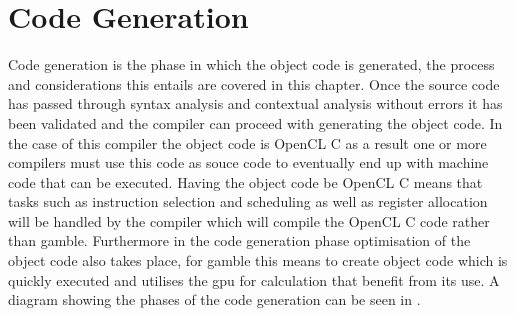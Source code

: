 \chapter{Code Generation}
Code generation is the phase in which the object code is generated, the process and considerations this entails are covered in this chapter.
Once the source code has passed through syntax analysis and contextual analysis without errors it has been validated and the compiler can proceed with generating the object code.
In the case of this compiler the object code is OpenCL C as a result one or more compilers must use this code as souce code to eventually end up with machine code that can be executed.
Having the object code be OpenCL C means that tasks such as instruction selection and scheduling as well as register allocation will be handled by the compiler which will compile the OpenCL C code rather than \gls{gamble}.
Furthermore in the code generation phase optimisation of the object code also takes place, for \gls{gamble} this means to create object code which is quickly executed and utilises the \acrshort{gpu} for calculation that benefit from its use.
A diagram showing the phases of the code generation can be seen in .


